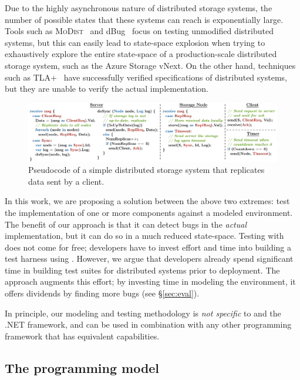 Due to the highly asynchronous nature of distributed storage systems, the number of possible states that these systems can reach is exponentially large. Tools such as \textsc{MoDist}~\cite{yang2009modist} and dBug~\cite{simsa2011dbug} focus on testing unmodified distributed systems, but this can easily lead to state-space explosion when trying to exhaustively explore the entire state-space of a production-scale distributed storage system, such as the Azure Storage vNext. On the other hand, techniques such as TLA+~\cite{lamport1994temporal} have successfully verified specifications of distributed systems, but they are unable to verify the actual implementation.

\begin{figure}[t]
\centering
\includegraphics[width=\linewidth]{img/example_code}
\vspace{-7mm}
\caption{Pseudocode of a simple distributed storage system that replicates data sent by a client.}
\label{fig:example}
\vspace{-2mm}
\end{figure}

In this work, we are proposing a solution between the above two extremes: test the implementation of one or more components against a modeled \psharp environment. The benefit of our approach is that it can detect bugs in the \emph{actual} implementation, but it can do so in a much reduced state-space. Testing with \psharp does not come for free; developers have to invest effort and time into building a test harness using \psharp. However, we argue that developers already spend significant time in building test suites for distributed systems prior to deployment. The \psharp approach augments this effort; by investing time in modeling the environment, it offers dividends by finding more bugs (see \S\ref{sec:eval}).

In principle, our modeling and testing methodology is \emph{not specific} to \psharp and the .NET framework, and can be used in combination with any other programming framework that has equivalent capabilities.

\vspace{-2mm}
\subsection{The \psharp programming model}
\label{sec:overview:psharp}

